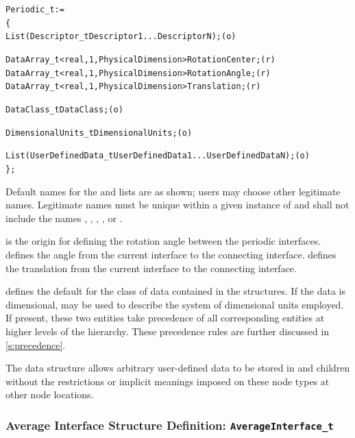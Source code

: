 \begin{alltt}
  Periodic\_t :=
    \{
    List( Descriptor\_t Descriptor1 ... DescriptorN ) ;                      (o)

    DataArray\_t<real, 1, PhysicalDimension> RotationCenter ;                (r)
    DataArray\_t<real, 1, PhysicalDimension> RotationAngle ;                 (r)
    DataArray\_t<real, 1, PhysicalDimension> Translation ;                   (r)

    DataClass\_t DataClass ;                                                 (o)

    DimensionalUnits\_t DimensionalUnits ;                                   (o)

    List( UserDefinedData\_t UserDefinedData1 ... UserDefinedDataN ) ;       (o)
    \} ;
\end{alltt}

\begin{notes}
\item
 Default names for the  and
  lists are as shown; users may choose other
 legitimate names.
 Legitimate names must be unique within a given instance of
  and shall not include the names ,
 , , ,
 or .
\end{notes}

 is the origin for defining the rotation angle
between the periodic interfaces.
 defines the angle from the current interface to
the connecting interface.
 defines the translation from the current interface
to the connecting interface.

 defines the default for the class of data contained in
the  structures.
If the data is dimensional,  may be used to
describe the system of dimensional units employed.
If present, these two entities take precedence of all corresponding
entities at higher levels of the hierarchy.
These precedence rules are further discussed in \autoref{s:precedence}.

The  data structure allows arbitrary
user-defined data to be stored in  and
 children without the restrictions or implicit
meanings imposed on these node types at other node locations.

\subsubsection{Average Interface Structure Definition: \texttt{AverageInterface\_t}}
\label{s:AverageInterface}

